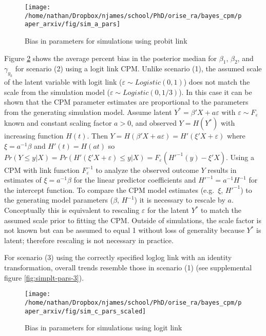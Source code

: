 \documentclass[
]{article}
\begin{document}
\begin{figure}

{\centering \texttt{[image: /home/nathan/Dropbox/njames/school/PhD/orise\_ra/bayes\_cpm/paper\_arxiv/fig/sim\_a\_pars]} 

}

\caption{Bias in parameters for simulations using probit link}\label{fig:simplt-pars-1}
\end{figure}

Figure \ref{fig:simplt-pars-2} shows the average percent bias in the posterior median for \(\beta_1\), \(\beta_2\), and \(\gamma_{y_k}\) for scenario (2) using a logit link CPM. Unlike scenario (1), the assumed scale of the latent variable with logit link (\(\varepsilon \sim Logistic(0,1)\)) does not match the scale from the simulation model (\(\varepsilon \sim Logistic(0,1/3)\)). In this case it can be shown that the CPM parameter estimates are proportional to the parameters from the generating simulation model. Assume latent \(Y^*=\beta'X + a\varepsilon\) with \(\varepsilon \sim F_{\varepsilon}\) known and constant scaling factor \(a>0\), and observed \(Y=H(Y^*)\) with increasing function \(H(t)\). Then \(Y=H(\beta'X+a\varepsilon)=H'(\xi'X+\varepsilon)\) where \(\xi=a^{-1}\beta\) and \(H'(t)=H(at)\) so \(Pr(Y \le y|X)=Pr(H'(\xi'X+\varepsilon)\le y|X)=F_{\varepsilon}(H'^{-1}(y)-\xi'X)\). Using a CPM with link function \(F_{\varepsilon}^{-1}\) to analyze the observed outcome \(Y\) results in estimates of \(\xi=a^{-1}\beta\) for the linear predictor coefficients and \(H'^{-1}=a^{-1}H^{-1}\) for the intercept function. To compare the CPM model estimates (e.g.~\(\xi\), \(H'^{-1}\)) to the generating model parameters (\(\beta\), \(H^{-1}\)) it is necessary to rescale by \(a\). Conceptually this is equivalent to rescaling \(\varepsilon\) for the
latent \(Y^*\) to match the assumed scale prior to fitting the CPM. Outside of simulations, the scale factor is not known but can be assumed to equal 1 without loss of generality because \(Y^*\) is latent; therefore rescaling is not necessary in practice.

For scenario (3) using the correctly specified loglog link with an identity transformation, overall trends resemble those in scenario (1) (see supplemental figure \ref{fig:simplt-pars-3}).

\begin{figure}

{\centering \texttt{[image: /home/nathan/Dropbox/njames/school/PhD/orise\_ra/bayes\_cpm/paper\_arxiv/fig/sim\_c\_pars\_scaled]} 

}

\caption{Bias in parameters for simulations using logit link}\label{fig:simplt-pars-2}
\end{figure}
\end{document}
